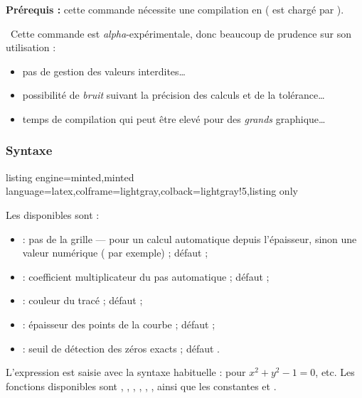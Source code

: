 \documentclass[11pt,a4paper]{ltxdoc}
\begin{document}
\smallskip

\textbf{Prérequis :} cette commande nécessite une compilation en  ( est chargé par ).

\smallskip

{\scriptsize\faBomb}~Cette commande est \textit{alpha}-expérimentale, donc beaucoup de prudence sur son utilisation :

\begin{itemize}
  \item pas de gestion des valeurs interdites\ldots
  \item possibilité de \textit{bruit} suivant la précision des calculs et de la tolérance\ldots
  \item temps de compilation qui peut être elevé pour des \textit{grands} graphique\ldots
\end{itemize}

\subsubsection{Syntaxe}

\begin{tcblisting}{listing engine=minted,minted language=latex,colframe=lightgray,colback=lightgray!5,listing only}
\end{tcblisting}

Les  disponibles sont :

\begin{itemize}
  \item {} : pas de la grille —  pour un calcul automatique depuis l'épaisseur, sinon une valeur numérique ( par exemple) ; défaut  ;
  \item {} : coefficient multiplicateur du pas automatique ; défaut  ;
  \item {} : couleur du tracé ; défaut  ;
  \item {} : épaisseur des points de la courbe ; défaut \MontreCode{0.2875pt} ;
  \item {} : seuil de détection des zéros exacts ; défaut .
\end{itemize}

L'expression  est saisie avec la syntaxe habituelle :  pour $x^2+y^2-1=0$,  etc. Les fonctions disponibles sont , , , , , ,  ainsi que les constantes  et .
\end{document}
